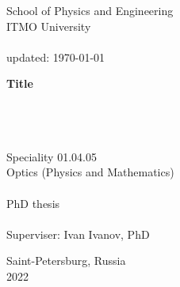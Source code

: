 \thispagestyle{empty}


\vspace{0pt plus2fill} %
\begin{center}
	School of Physics and Engineering \\
	ITMO University \\ \ \\
	{\tiny updated: \today} 
\end{center}

\vspace*{230pt}
\begin{center}
\textbf {\large %
Title
} \\ \ \\ \
{\large 
	}
 \\ \ 

Speciality 01.04.05\\
Optics (Physics and Mathematics) \\ \ \\
PhD thesis \\ \ \\ 
Superviser: Ivan Ivanov, PhD
\end{center}

\vspace{0pt plus2fill} %

\begin{center}
	Saint-Petersburg, Russia\\
	2022
\end{center}


